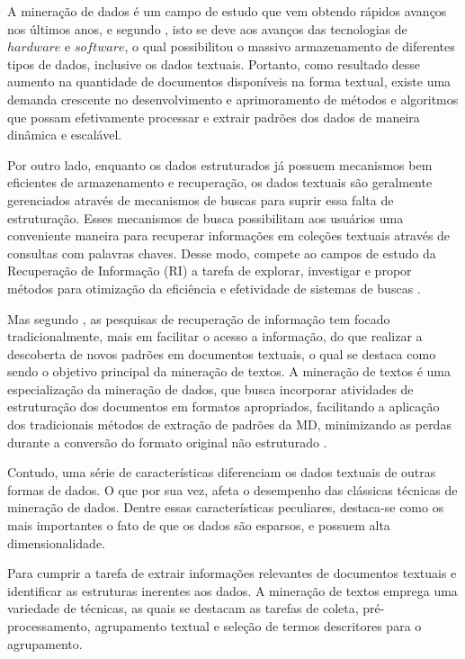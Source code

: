 A mineração de dados é um campo de estudo que vem obtendo rápidos avanços nos últimos anos, e
segundo , isto se deve aos avanços das tecnologias de $hardware$ e
$software$, o qual possibilitou o massivo armazenamento de diferentes tipos de dados, inclusive os
dados textuais. Portanto, como resultado desse aumento na quantidade de documentos disponíveis na
forma textual, existe uma demanda crescente no desenvolvimento e aprimoramento de métodos e
algoritmos que possam efetivamente processar e extrair padrões dos dados de maneira dinâmica e
escalável. 

Por outro lado, enquanto os dados estruturados já possuem mecanismos bem eficientes de armazenamento
e recuperação, os dados textuais são geralmente gerenciados através de mecanismos de buscas para
suprir essa falta de estruturação. Esses mecanismos de busca possibilitam aos usuários uma
conveniente maneira para recuperar informações em coleções textuais através de consultas com palavras
chaves. Desse modo, compete ao campos de estudo da Recuperação de Informação (RI) a tarefa de
explorar, investigar e propor métodos para otimização da eficiência e efetividade de
sistemas de buscas \cite{Baeza2011}. 

Mas segundo , as pesquisas de recuperação de informação tem focado
tradicionalmente, mais em facilitar o acesso a informação, do que realizar a descoberta de novos
padrões em documentos textuais, o qual se destaca como sendo o objetivo principal da mineração de
textos. A mineração de textos é uma especialização da mineração de dados, que busca incorporar
atividades de estruturação dos documentos em formatos apropriados, facilitando a aplicação dos
tradicionais métodos de extração de padrões da MD, minimizando as perdas durante a conversão do
formato original não estruturado \cite{Nogueira2013}.

Contudo, uma série de características diferenciam os dados textuais de outras formas de dados. O que
por sua vez, afeta o desempenho das clássicas técnicas de mineração de dados.  Dentre essas
características peculiares, destaca-se como os mais importantes o fato de que os dados são esparsos,
e possuem alta dimensionalidade.


Para cumprir a tarefa de extrair informações relevantes de documentos textuais e identificar as
estruturas inerentes aos dados. A mineração de textos emprega uma variedade de técnicas, as quais se
destacam as tarefas de coleta, pré-processamento, agrupamento textual e seleção de termos
descritores para o agrupamento. 

